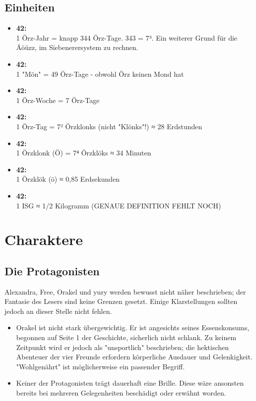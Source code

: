 \section{Einheiten}

\begin{itemize}
	\item \textbf{42:}\\1 Örz-Jahr = knapp 344 Örz-Tage. 343 = 7³. Ein weiterer Grund für die Äöüzz, im Siebenerersystem zu rechnen.
	\item \textbf{42:}\\1 "Mön" = 49 Örz-Tage - obwohl Örz keinen Mond hat
	\item \textbf{42:}\\1 Örz-Woche = 7 Örz-Tage
	\item \textbf{42:}\\1 Örz-Tag = 7² Örzklonks (nicht "Klönks"!) ≈ 28 Erdstunden
	\item \textbf{42:}\\1 Örzklonk (Ö) = 7⁴ Örzklöks ≈ 34 Minuten
	\item \textbf{42:}\\1 Örzklök (ö) ≈ 0,85 Erdsekunden
	\item \textbf{42:}\\1 ISG ≈ 1/2 Kilogramm (GENAUE DEFINITION FEHLT NOCH)
\end{itemize}


\chapter{Charaktere}

\section{Die Protagonisten}

Alexandra, Free, Orakel und yury werden bewusst nicht näher beschrieben; der Fantasie des Lesers sind keine Grenzen gesetzt. Einige Klarstellungen sollten jedoch an dieser Stelle nicht fehlen.

\begin{itemize}
	\item Orakel ist nicht stark übergewichtig. Er ist angesichts seines Essenskonsums, begonnen auf Seite 1 der Geschichte, sicherlich nicht schlank. Zu keinem Zeitpunkt wird er jedoch als "unsportlich" beschrieben; die hektischen Abenteuer der vier Freunde erfordern körperliche Ausdauer und Gelenkigkeit. "Wohlgenährt" ist möglicherweise ein passender Begriff.
	\item Keiner der Protagonisten trägt dauerhaft eine Brille. Diese wäre ansonsten bereits bei mehreren Gelegenheiten beschädigt oder erwähnt worden.
\end{itemize}


